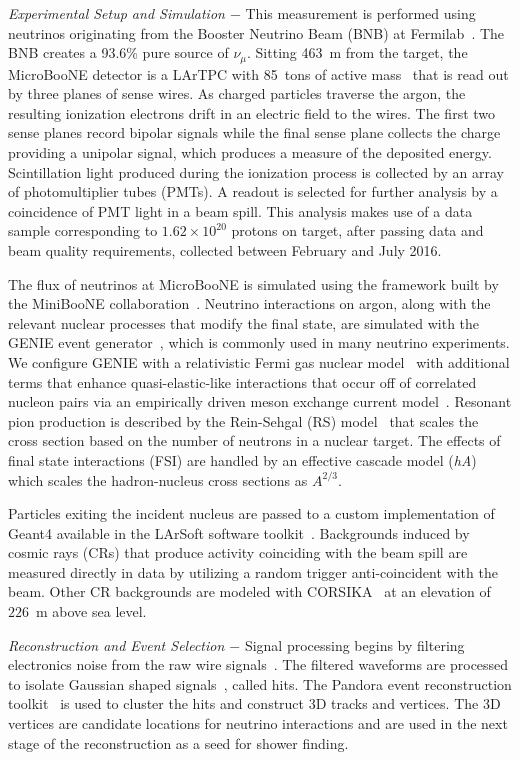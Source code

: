 \documentclass[%
 reprint,
superscriptaddress,
amsmath,amssymb,
prl,
floatfix,
]{revtex4-1}
\newcommand{\numu}{\nu_{\mu}}
\begin{document}
{\it Experimental Setup and Simulation $-$} This measurement is performed using neutrinos originating from the Booster Neutrino Beam (BNB) at Fermilab~\cite{bnb}. The BNB creates a 93.6\% pure source of $\numu$. Sitting 463~m from the target, the MicroBooNE detector is a LArTPC with 85~tons of active mass~\cite{uBdet} that is read out by three planes of sense wires. As charged particles traverse the argon, the resulting ionization electrons drift in an electric field to the wires. The first two sense planes record bipolar signals while the final sense plane collects the charge providing a unipolar signal, which produces a measure of the deposited energy. Scintillation light produced during the ionization process is collected by an array of photomultiplier tubes (PMTs). A readout is selected for further analysis by a coincidence of PMT light in a beam spill. This analysis makes use of a data sample corresponding to $1.62\times10^{20}$ protons on target, after passing data and beam quality requirements, collected between February and July 2016.

The flux of neutrinos at MicroBooNE is simulated using the framework built by the MiniBooNE collaboration~\cite{bnb}. Neutrino interactions on argon, along with the relevant nuclear processes that modify the final state, are simulated with the GENIE event generator~\cite{genie}, which is commonly used in many neutrino experiments. We configure GENIE with a relativistic Fermi gas nuclear model~\cite{fermigas} with additional terms that enhance quasi-elastic-like interactions that occur off of correlated nucleon pairs via an empirically driven meson exchange current model~\cite{mec}. Resonant pion production is described by the Rein-Sehgal (RS) model~\cite{rs} that scales the cross section based on the number of neutrons in a nuclear target. The effects of final state interactions (FSI) are handled by an effective cascade model ({\it hA})~\cite{genieuncert} which scales the hadron-nucleus cross sections as $A^{2/3}$. 

Particles exiting the incident nucleus are passed to a custom implementation of {\sc Geant4} available in the LArSoft software toolkit~\cite{g4,larsoft}. Backgrounds induced by cosmic rays (CRs) that produce activity coinciding with the beam spill are measured directly in data by utilizing a random trigger anti-coincident with the beam. Other CR backgrounds are modeled with CORSIKA~\cite{corsika} at an elevation of $226$~m above sea level.

{\it Reconstruction and Event Selection $-$ } Signal processing begins by filtering electronics noise from the raw wire signals~\cite{noise}. The filtered waveforms are processed to isolate Gaussian shaped signals~\cite{hits}, called hits. The Pandora event reconstruction toolkit~\cite{pandora} is used to cluster the hits and construct 3D tracks and vertices. The 3D vertices are candidate locations for neutrino interactions and are used in the next stage of the reconstruction as a seed for shower finding.
\end{document}
